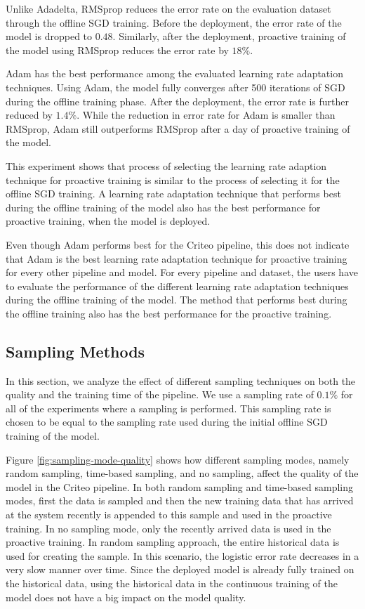 Unlike Adadelta, RMSprop reduces the error rate on the evaluation dataset through the offline SGD training.
Before the deployment, the error rate of the model is dropped to $0.48$.
Similarly, after the deployment, proactive training of the model using RMSprop reduces the error rate by $18\%$.

Adam has the best performance among the evaluated learning rate adaptation techniques.
Using Adam, the model fully converges after 500 iterations of SGD during the offline training phase.
After the deployment, the error rate is further reduced by $1.4\%$.
While the reduction in error rate for Adam is smaller than RMSprop, Adam still outperforms RMSprop after a day of proactive training of the model.

This experiment shows that process of selecting the learning rate adaption technique for proactive training is similar to the process of selecting it for the offline SGD training.
A learning rate adaptation technique that performs best during the offline training of the model also has the best performance for proactive training, when the model is deployed.

Even though Adam performs best for the Criteo pipeline, this does not indicate that Adam is the best learning rate adaptation technique for proactive training for every other pipeline and model.
For every pipeline and dataset, the users have to evaluate the performance of the different learning rate adaptation techniques during the offline training of the model.
The method that performs best during the offline training also has the best performance for the proactive training.

\subsection{Sampling Methods}
In this section, we analyze the effect of different sampling techniques on both the quality and the training time of the pipeline.
We use a sampling rate of $0.1\%$ for all of the experiments where a sampling is performed.
This sampling rate is chosen to be equal to the sampling rate used during the initial offline SGD training of the model.

Figure \ref{fig:sampling-mode-quality} shows how different sampling modes, namely random sampling, time-based sampling, and no sampling, affect the quality of the model in the Criteo pipeline.
In both random sampling and time-based sampling modes, first the data is sampled and then the new training data that has arrived at the system recently is appended to this sample and used in the proactive training.
In no sampling mode, only the recently arrived data is used in the proactive training.
In random sampling approach, the entire historical data is used for creating the sample.
In this scenario, the logistic error rate decreases in a very slow manner over time.
Since the deployed model is already fully trained on the historical data, using the historical data in the continuous training of the model does not have a big impact on the model quality.


